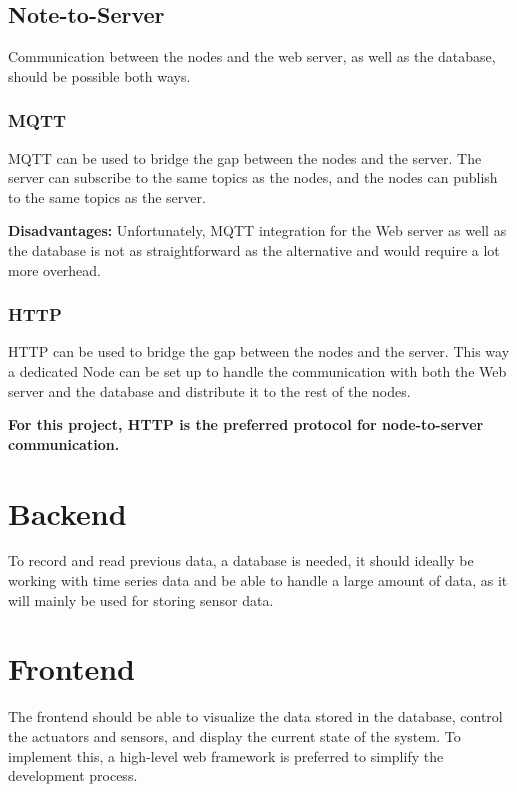         \subsection{Note-to-Server}
        Communication between the nodes and the web server, as well as the 
        database, should be possible both ways.

            \subsubsection{MQTT}
            MQTT can be used to bridge the gap between the nodes and the server.
            The server can subscribe to the same topics as the nodes, and the nodes
            can publish to the same topics as the server.
        
                \textbf{Disadvantages:}
                Unfortunately, MQTT integration for the Web server as well as the database
                is not as straightforward as the alternative and would require a lot more 
                overhead.
        
            \subsubsection{HTTP}
            HTTP can be used to bridge the gap between the nodes and the server.
            This way a dedicated Node can be set up to handle the communication
            with both the Web server and the database and distribute it to the 
            rest of the nodes.
        
            \vspace{1cm}
            \textbf{For this project, HTTP is the preferred protocol for 
            node-to-server communication.}

    \section{Backend}
    To record and read previous data, a database is needed, it should ideally be 
    working with time series data and be able to handle a large amount of data, 
    as it will mainly be used for storing sensor data.

    \section{Frontend}
    The frontend should be able to visualize the data stored in the database,
    control the actuators and sensors, and display the current state of the 
    system. To implement this, a high-level web framework is preferred to 
    simplify the development process. 
